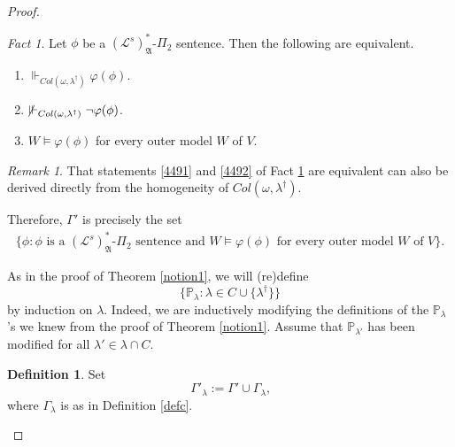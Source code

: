 \documentclass[12pt, twoside]{memoir}
\numberwithin{equation}{section}
\theoremstyle{definition}
\newtheorem{defi}[thm]{Definition}
\theoremstyle{remark}
\newtheorem{rem}[thm]{Remark}
\newtheorem{fact}[thm]{Fact}
\theoremstyle{definition}
\theoremstyle{definition}
\theoremstyle{definition}
\theoremstyle{remark}
\begin{document}
\begin{proof}
\begin{fact}\label{fact449}
Let $\phi$ be a $(\mathcal{L}^s)^*_{\mathfrak{A}}$-$\Pi_2$ sentence. Then the following are equivalent.
\begin{enumerate}[label=(\arabic*)$_{\phi}$]
    \item\label{4491} $\Vdash_{Col(\omega, \lambda^{\dagger})} \varphi(\phi)$.
    \item\label{4492} $\mspace{-3mu}\not \mspace{3mu}\Vdash_{Col(\omega, \lambda^{\dagger})} \neg \varphi(\phi)$.
    \item $W \models \varphi(\phi)$ for every outer model $W$ of $V$.
\end{enumerate}
\end{fact}

\begin{rem}
That statements \ref{4491} and \ref{4492} of Fact \ref{fact449} are equivalent can also be derived directly from the homogeneity of $Col(\omega, \lambda^{\dagger})$.
\end{rem}

Therefore, $\Gamma'$ is precisely the set 
\begin{align*}
    \{\phi : \phi \text{ is a } (\mathcal{L}^s)^*_{\mathfrak{A}}\text{-}\Pi_2 \text{ sentence and } W \models \varphi(\phi) \text{ for every outer model } W \text{ of } V\} \text{.}
\end{align*}

As in the proof of Theorem \ref{notion1}, we will (re)define $$\{\mathbb{P}_{\lambda} : \lambda \in C \cup \{\lambda^{\dagger}\}\}$$ by induction on $\lambda$. Indeed, we are inductively modifying the definitions of the $\mathbb{P}_{\lambda}$'s we knew from the proof of Theorem \ref{notion1}. Assume that $\mathbb{P}_{\lambda'}$ has been modified for all $\lambda' \in \lambda \cap C$. 

\begin{defi}\label{def447}
Set
\begin{equation*}
    \Gamma'_{\lambda} := \Gamma' \cup \Gamma_{\lambda} \text{,}
\end{equation*}
where $\Gamma_{\lambda}$ is as in Definition \ref{defc}. 
\end{defi}


\end{proof}
\end{document}
